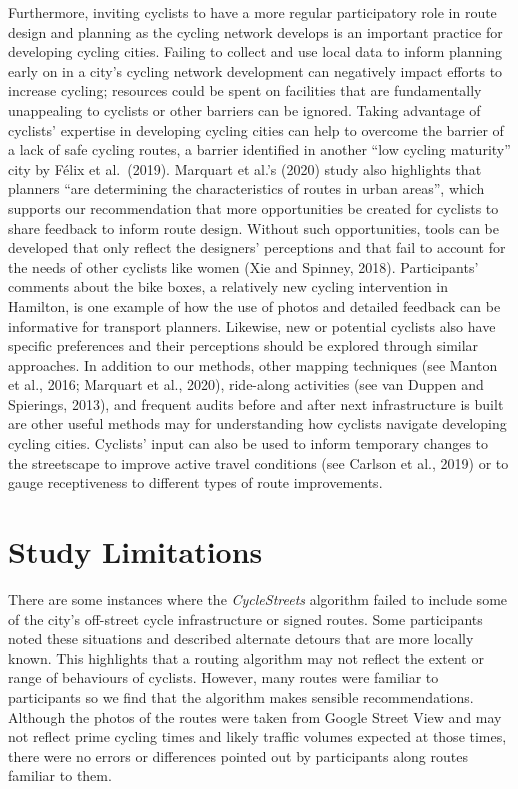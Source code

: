\documentclass[]{elsarticle} %
\begin{document}
Furthermore, inviting cyclists to have a more regular participatory role
in route design and planning as the cycling network develops is an
important practice for developing cycling cities. Failing to collect and
use local data to inform planning early on in a city's cycling network
development can negatively impact efforts to increase cycling; resources
could be spent on facilities that are fundamentally unappealing to
cyclists or other barriers can be ignored. Taking advantage of cyclists'
expertise in developing cycling cities can help to overcome the barrier
of a lack of safe cycling routes, a barrier identified in another ``low
cycling maturity'' city by Félix et al.~(2019). Marquart et al.'s (2020)
study also highlights that planners ``are determining the
characteristics of routes in urban areas'', which supports our
recommendation that more opportunities be created for cyclists to share
feedback to inform route design. Without such opportunities, tools can
be developed that only reflect the designers' perceptions and that fail
to account for the needs of other cyclists like women (Xie and Spinney,
2018). Participants' comments about the bike boxes, a relatively new
cycling intervention in Hamilton, is one example of how the use of
photos and detailed feedback can be informative for transport planners.
Likewise, new or potential cyclists also have specific preferences and
their perceptions should be explored through similar approaches. In
addition to our methods, other mapping techniques (see Manton et al.,
2016; Marquart et al., 2020), ride-along activities (see van Duppen and
Spierings, 2013), and frequent audits before and after next
infrastructure is built are other useful methods may for understanding
how cyclists navigate developing cycling cities. Cyclists' input can
also be used to inform temporary changes to the streetscape to improve
active travel conditions (see Carlson et al., 2019) or to gauge
receptiveness to different types of route improvements.

\hypertarget{sec:limitations}{%
\section{Study Limitations}\label{sec:limitations}}

There are some instances where the \emph{CycleStreets} algorithm failed
to include some of the city's off-street cycle infrastructure or signed
routes. Some participants noted these situations and described alternate
detours that are more locally known. This highlights that a routing
algorithm may not reflect the extent or range of behaviours of cyclists.
However, many routes were familiar to participants so we find that the
algorithm makes sensible recommendations. Although the photos of the
routes were taken from Google Street View and may not reflect prime
cycling times and likely traffic volumes expected at those times, there
were no errors or differences pointed out by participants along routes
familiar to them.
\end{document}
